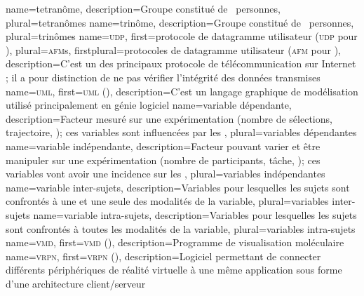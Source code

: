 %
{%
	name={tetranôme},%
	description={Groupe constitué de ~personnes},%
	plural={tetranômes}%
}
%
{%
	name={trinôme},%
	description={Groupe constitué de ~personnes},%
	plural={trinômes}%
}
%
{%
	name={\textsc{udp}},
	first={protocole de datagramme utilisateur (\textsc{udp} pour )},%
	plural={\textsc{afm}s},%
	firstplural={protocoles de datagramme utilisateur (\textsc{afm} pour )},%
	description={C'est un des principaux protocole de télécommunication sur Internet ; il a pour distinction de ne pas vérifier l'intégrité des données transmises}
}
%
{%
	name={\textsc{uml}},%
	first={\textsc{uml} ()},%
	description={C'est un langage graphique de modélisation utilisé principalement en génie logiciel}%
}
%
{%
	name={variable dépendante},%
	description={Facteur mesuré sur une expérimentation (nombre de sélections, trajectoire, \myetc); ces variables sont influencées par les },%
	plural={variables dépendantes}%
}
%
{%
	name={variable indépendante},%
	description={Facteur pouvant varier et être manipuler sur une expérimentation (nombre de participants, tâche, \myetc); ces variables vont avoir une incidence sur les },%
	plural={variables indépendantes}%
}
%
{%
	name={variable inter-sujets},%
	description={Variables pour lesquelles les sujets sont confrontés à une et une seule des modalités de la variable},%
	plural={variables inter-sujets}%
}
%
{%
	name={variable intra-sujets},%
	description={Variables pour lesquelles les sujets sont confrontés à toutes les modalités de la variable},%
	plural={variables intra-sujets}%
}
%
{%
	name={\textsc{vmd}},%
	first={\textsc{vmd} ()},%
	description={Programme de visualisation moléculaire }%
}
%
{%
	name={\textsc{vrpn}},%
	first={\textsc{vrpn} ()},%
	description={Logiciel permettant de connecter différents périphériques de réalité virtuelle à une même application sous forme d'une architecture client/serveur }%
}
